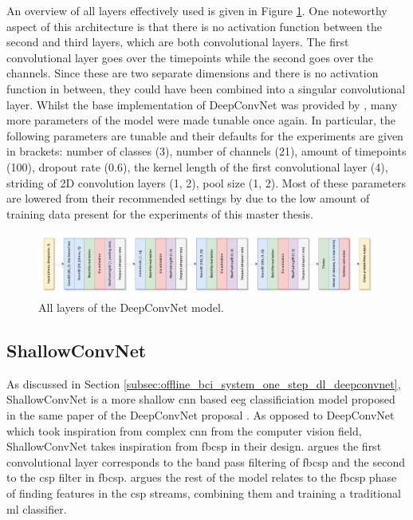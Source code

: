 An overview of all layers effectively used is given in Figure \ref{fig:offline_bci_system_dl_deepconvnet_full}.
One noteworthy aspect of this architecture is that there is no activation function between the second and third layers, which are both convolutional layers.
The first convolutional layer goes over the timepoints while the second goes over the channels.
Since these are two separate dimensions and there is no activation function in between, they could have been combined into a singular convolutional layer. 
Whilst the base implementation of DeepConvNet was provided by \citet{arl_eegmodels}, many more parameters of the model were made tunable once again.
In particular, the following parameters are tunable and their defaults for the experiments are given in brackets: number of classes (3), number of channels (21), amount of timepoints (100), dropout rate (0.6), the kernel length of the first convolutional layer (4), striding of 2D convolution layers (1, 2), pool size (1, 2).
Most of these parameters are lowered from their recommended settings by \citet{eeg_model_hbm} due to the low amount of training data present for the experiments of this master thesis.

\begin{figure}[t]
    \centering
    \includegraphics[width=\linewidth]{../images/pipeline/deepconvnet_full.pdf}
    \captionsetup{width=0.8\linewidth}
    \captionsetup{justification=centering}
    \caption{All layers of the DeepConvNet model.}
    \label{fig:offline_bci_system_dl_deepconvnet_full}
\end{figure}



\subsection{ShallowConvNet}
\label{subsec:offline_bci_system_one_step_dl_shallowconvnet}

As discussed in Section \ref{subsec:offline_bci_system_one_step_dl_deepconvnet}, ShallowConvNet is a more shallow \gls{cnn} based \gls{eeg} classificiation model proposed in the same paper of the DeepConvNet proposal \citep{eeg_model_hbm}.
As opposed to DeepConvNet which took inspiration from complex \gls{cnn} from the computer vision field, ShallowConvNet takes inspiration from \gls{fbcsp} in their design.
 argues the first convolutional layer corresponds to the band pass filtering of \gls{fbcsp} and the second to the \gls{csp} filter in \gls{fbcsp}.
 argues the rest of the model relates to the \gls{fbcsp} phase of finding features in the \gls{csp} streams, combining them and training a traditional \gls{ml} classifier.

